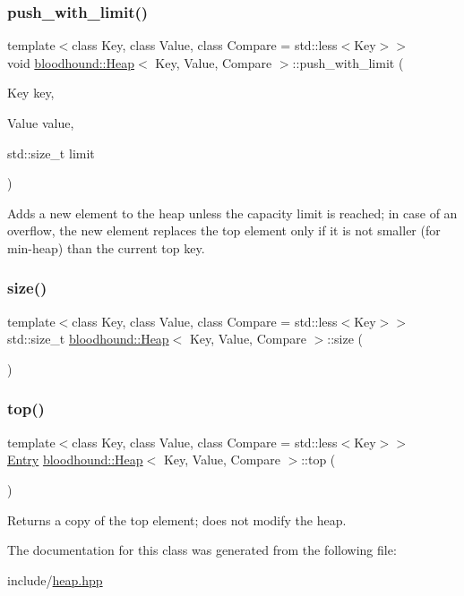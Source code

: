 \subsubsection{\texorpdfstring{push\+\_\+with\+\_\+limit()}{push\_with\_limit()}}
{\footnotesize\ttfamily template$<$class Key, class Value, class Compare = std\+::less$<$\+Key$>$$>$ \\
void \hyperlink{classbloodhound_1_1Heap}{bloodhound\+::\+Heap}$<$ Key, Value, Compare $>$\+::push\+\_\+with\+\_\+limit (\begin{DoxyParamCaption}\item[{Key}]{key,  }\item[{Value}]{value,  }\item[{std\+::size\+\_\+t}]{limit }\end{DoxyParamCaption})\hspace{0.3cm}{\ttfamily [inline]}}

Adds a new element to the heap unless the capacity limit is reached; in case of an overflow, the new element replaces the top element only if it is not smaller (for min-\/heap) than the current top key. \mbox{\label{classbloodhound_1_1Heap_a747e3e3ebfe9c41ab9a37daa9af63212}} 
\subsubsection{\texorpdfstring{size()}{size()}}
{\footnotesize\ttfamily template$<$class Key, class Value, class Compare = std\+::less$<$\+Key$>$$>$ \\
std\+::size\+\_\+t \hyperlink{classbloodhound_1_1Heap}{bloodhound\+::\+Heap}$<$ Key, Value, Compare $>$\+::size (\begin{DoxyParamCaption}{ }\end{DoxyParamCaption})\hspace{0.3cm}{\ttfamily [inline]}}

\mbox{\label{classbloodhound_1_1Heap_af13e8e8fe8a0ae8f683421a79d97c30a}} 
\subsubsection{\texorpdfstring{top()}{top()}}
{\footnotesize\ttfamily template$<$class Key, class Value, class Compare = std\+::less$<$\+Key$>$$>$ \\
\hyperlink{structbloodhound_1_1Heap_1_1Entry}{Entry} \hyperlink{classbloodhound_1_1Heap}{bloodhound\+::\+Heap}$<$ Key, Value, Compare $>$\+::top (\begin{DoxyParamCaption}{ }\end{DoxyParamCaption})\hspace{0.3cm}{\ttfamily [inline]}}



Returns a copy of the top element; does not modify the heap. 



The documentation for this class was generated from the following file\+:\begin{DoxyCompactItemize}
\item 
include/\hyperlink{heap_8hpp}{heap.\+hpp}\end{DoxyCompactItemize}
